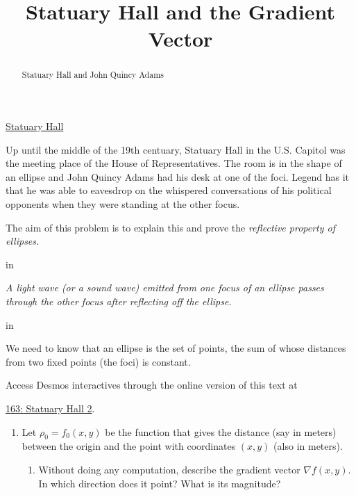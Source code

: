 \documentclass{ximera}
\title{Statuary Hall and the Gradient Vector}
\newcommand{\pskip}{\vskip 0.1 in}
\begin{document}
\begin{abstract}
Statuary Hall and John Quincy Adams
\end{abstract}
\maketitle


\begin{question}  \label{Q656g5y4546}

\begin{center}
\end{center}

\href{https://www.youtube.com/watch?v=FX6rUU_74kk}{Statuary Hall}


Up until the middle of the 19th centuary, Statuary Hall in the U.S. Capitol was the meeting place of the House of Representatives. The room is in the shape of an ellipse and John Quincy Adams had his desk at one of the foci. Legend has it that he was able to eavesdrop on the whispered conversations of his political opponents when they were standing at the other focus.

The aim of this problem is to explain this and prove the \emph{reflective property of ellipses.}

\pskip

\emph{A light wave (or a sound wave) emitted from one focus of an ellipse passes through the other focus after reflecting off the ellipse.}

\pskip

We need to know that an ellipse is the set of points, the sum of whose distances from two fixed points (the foci) is constant. 

\begin{onlineOnly}
    \begin{center}
\end{center}
\end{onlineOnly}

Access Desmos interactives through the online version of this text at
 
\href{https://www.desmos.com/3d/3inyk1dxv4}{163: Statuary Hall 2}.

\begin{enumerate}
\item Let $\rho_0 = f_0(x,y)$ be the function that gives the distance (say in meters) between the origin and the point with coordinates $(x,y)$ (also in meters).

\begin{enumerate}
\item Without doing any computation, describe the gradient vector $\nabla f(x,y)$. In which direction does it point? What is its magnitude?


\end{enumerate}
\end{enumerate}
\end{question}
\end{document}
